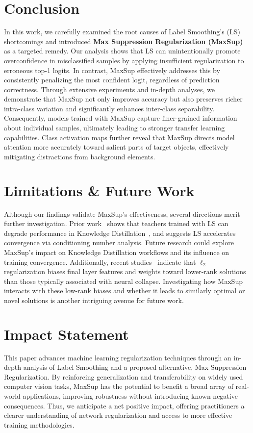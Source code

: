 \section{Conclusion}  
In this work, we carefully examined the root causes of Label Smoothing’s (LS) shortcomings and introduced \textbf{Max Suppression Regularization (MaxSup)} as a targeted remedy. Our analysis shows that LS can unintentionally promote overconfidence in misclassified samples by applying insufficient regularization to erroneous top-1 logits. In contrast, MaxSup effectively addresses this by consistently penalizing the most confident logit, regardless of prediction correctness. Through extensive experiments and in-depth analyses, we demonstrate that MaxSup not only improves accuracy but also preserves richer intra-class variation and significantly enhances inter-class separability. Consequently, models trained with MaxSup capture finer-grained information about individual samples, ultimately leading to stronger transfer learning capabilities. Class activation maps further reveal that MaxSup directs model attention more accurately toward salient parts of target objects, effectively mitigating distractions from background elements.

\section*{Limitations \& Future Work}
Although our findings validate MaxSup’s effectiveness, several directions merit further investigation. Prior work~\citep{muller2019does} shows that teachers trained with LS can degrade performance in Knowledge Distillation~\citep{hinton2015distilling}, and \citet{guo2024cross} suggests LS accelerates convergence via conditioning number analysis. Future research could explore MaxSup’s impact on Knowledge Distillation workflows and its influence on training convergence. Additionally, recent studies~\citep{sukenik2024neural,garrod2024persistence} indicate that \(\ell_2\) regularization biases final layer features and weights toward lower-rank solutions than those typically associated with neural collapse. Investigating how MaxSup interacts with these low-rank biases and whether it leads to similarly optimal or novel solutions is another intriguing avenue for future work.

\section*{Impact Statement}
This paper advances machine learning regularization techniques through an in-depth analysis of Label Smoothing and a proposed alternative, Max Suppression Regularization. By reinforcing generalization and transferability on widely used computer vision tasks, MaxSup has the potential to benefit a broad array of real-world applications, improving robustness without introducing known negative consequences. Thus, we anticipate a net positive impact, offering practitioners a clearer understanding of network regularization and access to more effective training methodologies.




